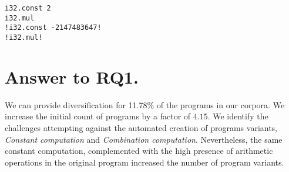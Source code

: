 {\begin{code}
\begin{minipage}[b]{0.32\linewidth}
\begin{minipage}[t]{0.46\linewidth}
            \begin{lstlisting}
i32.const 2
i32.mul
!i32.const -2147483647!
!i32.mul!
            \end{lstlisting}
        \end{minipage}
    \end{minipage}
    \end{code}
}



\section{Answer to RQ1.}

We can provide diversification for 11.78\% of the programs in our corpora. We increase the initial count of programs by a factor of $4.15$. We identify the challenges attempting against the automated creation of programs variants, \emph{Constant computation} and \emph{Combination computation}. Nevertheless, the same constant computation, complemented with the high presence of arithmetic operations in the original program increased the number of program variants. 


\begin{comment}

While our work is very limited by the provided corpora, it can be easily extended to other\dots

An application that benefits from the ablity of CROW is the large amount of generated variants. 


- CHeckLong questions for 80%
- Stress how to do experiments in Software Engineering, the theory behind how to do this in CS.
- The objects of the experiments are programs that ... 
- Motivate the corpora selection, size, can be ported, security sensitive, etc,
- Do not mention CROW in the selection criteria.
- The motivation is not related to tools, only to concepts
- Move paragraph after listing of coprpora to before.
- 


\end{comment}